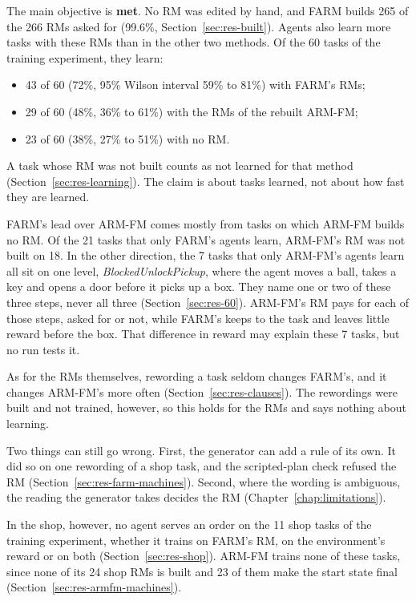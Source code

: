 \documentclass[11pt,english,listoffigures,listoftables]{tfgetsinf}
\newcommand{\env}[1]{\textsf{\slshape #1}}  %
\begin{document}
\noindent The main objective is \textbf{met}. No RM was edited by hand, and FARM builds 265 of the 266 RMs asked for (99.6\%, Section~\ref{sec:res-built}). Agents also learn more tasks with these RMs than in the other two methods. Of the 60 tasks of the training experiment, they learn:
\begin{itemize}
    \item 43 of 60 (72\%, 95\% Wilson interval 59\% to 81\%) with FARM's RMs;
    \item 29 of 60 (48\%, 36\% to 61\%) with the RMs of the rebuilt ARM-FM;
    \item 23 of 60 (38\%, 27\% to 51\%) with no RM.
\end{itemize}
\noindent A task whose RM was not built counts as not learned for that method (Section~\ref{sec:res-learning}). The claim is about tasks learned, not about how fast they are learned.

FARM's lead over ARM-FM comes mostly from tasks on which ARM-FM builds no RM. Of the 21 tasks that only FARM's agents learn, ARM-FM's RM was not built on 18. In the other direction, the 7 tasks that only ARM-FM's agents learn all sit on one level, \mbox{\env{BlockedUnlockPickup}}, where the agent moves a ball, takes a key and opens a door before it picks up a box. They name one or two of these three steps, never all three (Section~\ref{sec:res-60}). ARM-FM's RM pays for each of those steps, asked for or not, while FARM's keeps to the task and leaves little reward before the box. That difference in reward may explain these 7 tasks, but no run tests it.

As for the RMs themselves, rewording a task seldom changes FARM's, and it changes ARM-FM's more often (Section~\ref{sec:res-clauses}). The rewordings were built and not trained, however, so this holds for the RMs and says nothing about learning.

Two things can still go wrong. First, the generator can add a rule of its own. It did so on one rewording of a shop task, and the scripted-plan check refused the RM (Section~\ref{sec:res-farm-machines}). Second, where the wording is ambiguous, the reading the generator takes decides the RM (Chapter~\ref{chap:limitations}).

In the shop, however, no agent serves an order on the 11 shop tasks of the training experiment, whether it trains on FARM's RM, on the environment's reward or on both (Section~\ref{sec:res-shop}). ARM-FM trains none of these tasks, since none of its 24 shop RMs is built and 23 of them make the start state final (Section~\ref{sec:res-armfm-machines}).
\end{document}
